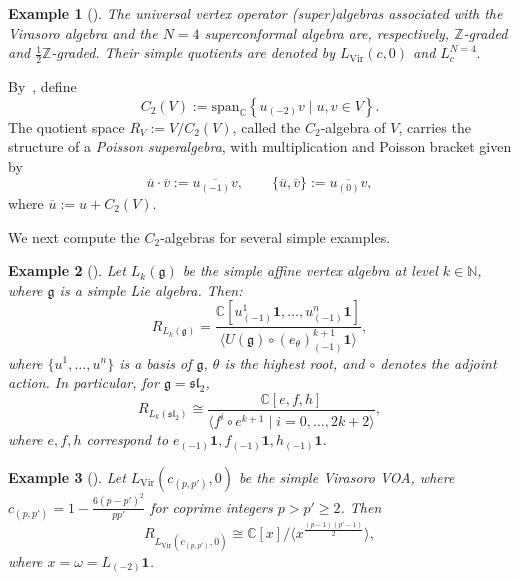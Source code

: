 \documentclass[9pt]{amsart}
\newtheorem{example}{Example}[section]
\begin{document}
\begin{example}[{\cite{kac1998vertex}}] \label{N=2}
The universal vertex operator (super)algebras associated with the Virasoro algebra and the \( N=4 \) superconformal algebra are, respectively, \( \mathbb{Z} \)-graded and \( \frac{1}{2} \mathbb{Z} \)-graded. Their simple quotients are denoted by
$L_{\mathrm{Vir}}(c,0)$ and $L^{N=4}_c.$
\end{example}



By~\cite{zhu1996modular}, define
\[
C_2(V) := \mathrm{span}_{\mathbb{C}} \left\{ u_{(-2)} v \mid u,v \in V \right\}.
\]
The quotient space \( R_V := V / C_2(V) \), called the \( C_2 \)-algebra of \( V \), carries the structure of a \emph{Poisson superalgebra}, with multiplication and Poisson bracket given by
\[
\overline{u} \cdot \overline{v} := \overline{u_{(-1)} v}, \qquad \{ \overline{u}, \overline{v} \} := \overline{u_{(0)} v},
\]
where \( \overline{u} := u + C_2(V) \).






We next compute the \( C_2 \)-algebras for several simple examples.

\begin{example}[{\cite{van2021chiral}}] \label{aff sl}
Let \( L_k(\mathfrak{g}) \) be the simple affine vertex algebra at level \( k \in \mathbb{N} \), where \( \mathfrak{g} \) is a simple Lie algebra. Then:
\[
R_{L_k(\mathfrak{g})} = \frac{\mathbb{C}[u^1_{(-1)} \mathbf{1}, \dots, u^n_{(-1)} \mathbf{1}]}{\langle U(\mathfrak{g}) \circ (e_\theta)_{(-1)}^{k+1} \mathbf{1} \rangle},
\]
where \( \{ u^1, \dots, u^n \} \) is a basis of \( \mathfrak{g} \), \( \theta \) is the highest root, and \( \circ \) denotes the adjoint action. In particular, for \( \mathfrak{g} = \mathfrak{sl}_2 \),
\[
R_{L_k(\mathfrak{sl}_2)} \cong \frac{\mathbb{C}[e, f, h]}{\langle f^i \circ e^{k+1} \mid i = 0, \dots, 2k+2 \rangle},
\]
where \( e, f, h \) correspond to \( e_{(-1)} \mathbf{1}, f_{(-1)} \mathbf{1}, h_{(-1)} \mathbf{1} \).
\end{example}


\begin{example}[\cite{van2021chiral}]
Let \( L_{\text{Vir}}(c_{(p,p')},0) \) be the simple Virasoro VOA, where \( c_{(p,p')} = 1 - \frac{6(p - p')^2}{pp'} \) for coprime integers \( p > p' \geq 2 \). Then
\[
R_{L_{\text{Vir}}(c_{(p,p')},0)} \cong \mathbb{C}[x]/\langle x^{\frac{(p-1)(p'-1)}{2}} \rangle,
\]
where \( x = \omega = L_{(-2)} \mathbf{1} \).
\end{example}
\end{document}
